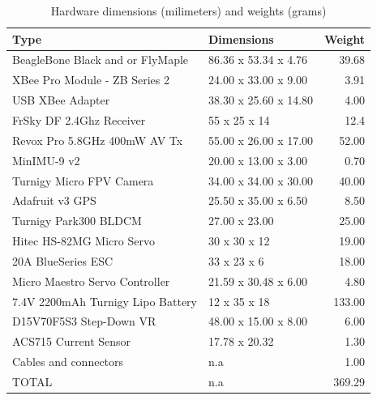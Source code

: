 \documentclass[a4paper, 10pt, twocolumn, titlepage]{article}
\newcommand{\head}[1]{\textnormal{\textbf{#1}}} %
\begin{document}
\begin{table}[!tb]
\centering
\caption{Hardware dimensions (milimeters) and weights (grams)}
  \begin{tabular}{llr}
    \toprule[1.5pt]
    \head{Type} & \head{Dimensions} & \head{Weight} \\
    \toprule[1.0pt]
    
    BeagleBone Black and or FlyMaple & 
    86.36 x 53.34 x 4.76 & 
    39.68 \\
    
    \midrule
    XBee Pro Module - ZB Series 2 & 
    24.00 x 33.00 x 9.00 & 
    3.91 \\
    
    USB XBee Adapter & 
    38.30 x 25.60 x 14.80 & 
    4.00 \\
    
    FrSky DF 2.4Ghz Receiver & 
    55 x 25 x 14 & 
    12.4 \\
    
    Revox Pro 5.8GHz 400mW AV Tx &
    55.00 x 26.00 x 17.00 &
    52.00 \\
    
    \midrule
    MinIMU-9 v2 &
    20.00 x 13.00 x 3.00 & 
    0.70 \\
    
    Turnigy Micro FPV Camera &
    34.00 x 34.00 x 30.00 & 
    40.00 \\
    
    Adafruit v3 GPS &
    25.50 x 35.00 x 6.50 & 
    8.50 \\
    
    \midrule
    Turnigy Park300 BLDCM &
    27.00 x 23.00 & 
    25.00 \\
    
    Hitec HS-82MG Micro Servo &
    30 x 30 x 12 & 
    19.00 \\
    
    20A BlueSeries ESC &
    33 x 23 x 6 & 
    18.00 \\
    
    Micro Maestro Servo Controller &
    21.59 x 30.48 x 6.00 & 
    4.80 \\
    
    \midrule
    7.4V 2200mAh Turnigy Lipo Battery  &
    12 x 35 x 18  & 
    133.00 \\
  
    D15V70F5S3 Step-Down VR &
    48.00 x 15.00 x 8.00 & 
    6.00 \\
    
    ACS715 Current Sensor &
    17.78 x 20.32 &
    1.30 \\
    
    \midrule
    Cables and connectors  &
    n.a & 
    1.00 \\
    
    \midrule
    TOTAL  &
    n.a &  
    369.29 \\
        
    \bottomrule[1.5pt]
  \end{tabular}
\label{tbl:hw_dim_weight}
\end{table}
\end{document}
